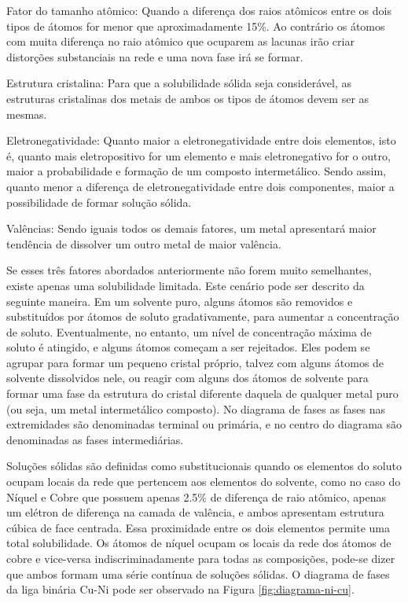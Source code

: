 \begin{alineas}
    \item Fator do tamanho atômico: Quando a diferença dos raios atômicos entre os dois tipos de átomos for menor que aproximadamente 15\%. Ao contrário os átomos com muita diferença no raio atômico que ocuparem as lacunas irão criar distorções substanciais na rede e uma nova fase irá se formar.
    \item Estrutura cristalina: Para que a solubilidade sólida seja considerável, as estruturas cristalinas dos metais de ambos os tipos de átomos devem ser as mesmas.
    \item Eletronegatividade: Quanto maior a eletronegatividade entre dois elementos, isto é, quanto mais eletropositivo for um elemento e mais eletronegativo for o outro, maior a probabilidade e formação de um composto intermetálico. Sendo assim, quanto menor a diferença de eletronegatividade entre dois componentes, maior a possibilidade de formar solução sólida.
    \item Valências: Sendo iguais todos os demais fatores, um metal apresentará maior tendência de dissolver um outro metal de maior valência.
\end{alineas}

Se esses três fatores abordados anteriormente não forem muito semelhantes, existe apenas uma solubilidade limitada. Este cenário pode ser descrito da seguinte maneira. Em um solvente puro, alguns átomos são removidos e substituídos por átomos de soluto gradativamente, para aumentar a concentração de soluto. Eventualmente, no entanto, um nível de concentração máxima de soluto é atingido, e alguns átomos começam a ser rejeitados. Eles podem se agrupar para formar um pequeno cristal próprio, talvez com alguns átomos de solvente dissolvidos nele, ou reagir com alguns dos átomos de solvente para formar uma fase da estrutura do cristal diferente daquela de qualquer metal puro (ou seja, um metal intermetálico composto). No diagrama de fases as fases nas extremidades são denominadas terminal ou primária, e no centro do diagrama são denominadas as fases intermediárias. 

Soluções sólidas são definidas como substitucionais quando os elementos do soluto ocupam locais da rede que pertencem aos elementos do solvente, como no caso  do Níquel e Cobre que possuem apenas 2.5\% de diferença de raio atômico, apenas um elétron de diferença na camada de valência, e ambos apresentam estrutura cúbica de face centrada. Essa proximidade entre os dois elementos permite uma total solubilidade. Os átomos de níquel ocupam os locais da rede dos átomos de cobre e vice-versa indiscriminadamente para todas as composições, pode-se dizer que ambos formam uma série contínua de soluções sólidas. O diagrama de fases da liga binária Cu-Ni pode ser observado na Figura \ref{fig:diagrama-ni-cu}.

